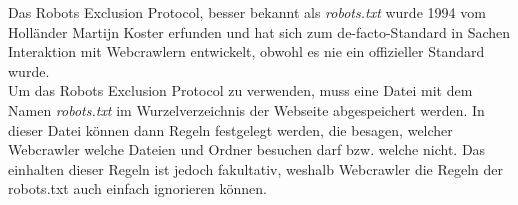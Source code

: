Das Robots Exclusion Protocol, besser bekannt als \emph{robots.txt} wurde 1994\cite{robots-date} vom Holländer Martijn Koster\cite{robots-martijn} erfunden und hat sich zum de-facto-Standard in Sachen Interaktion mit Webcrawlern entwickelt, obwohl es nie ein offizieller Standard wurde.\cite{robots-date}\\
Um das Robots Exclusion Protocol zu verwenden, muss eine Datei mit dem Namen \emph{robots.txt} im Wurzelverzeichnis der Webseite abgespeichert werden. In dieser Datei können dann Regeln festgelegt werden, die besagen, welcher Webcrawler welche Dateien und Ordner besuchen darf bzw. welche nicht. Das einhalten dieser Regeln ist jedoch fakultativ, weshalb Webcrawler die Regeln der robots.txt auch einfach ignorieren können.